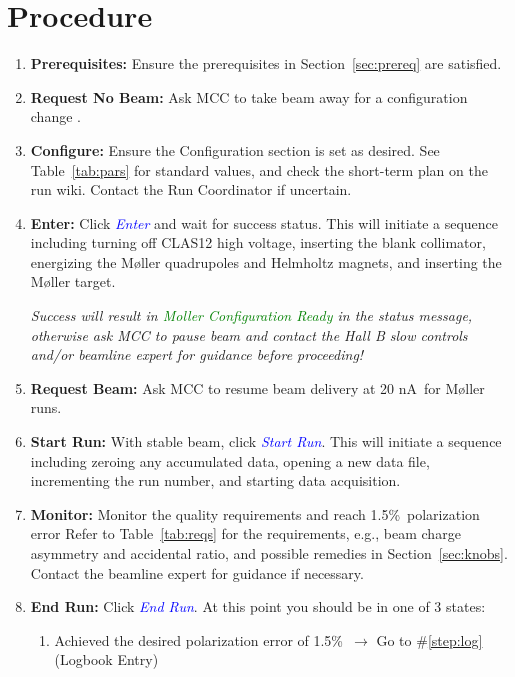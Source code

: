 \documentclass[amsmath,amssymb,notitlepage,12pt]{revtex4}
\newcommand{\ibeam}{20 nA\ }
\newcommand{\easy}{1.5\%}
\begin{document}
\section{Procedure}\label{sec:proc}

\begin{enumerate}\singlespacing
    \item {\bf Prerequisites:}  Ensure the prerequisites in Section~\ref{sec:prereq} are satisfied.
    \item {\bf Request No Beam:}  Ask MCC to take beam away for a configuration change \label{step:config}.
    \item {\bf Configure:}  Ensure the Configuration section is set as desired.
        See Table~\ref{tab:pars} for standard values, and check the short-term plan on the run wiki.  Contact the Run Coordinator if uncertain.
    \item {\bf Enter:} Click \textcolor{blue}{\em Enter} and wait for success status.
        This will initiate a sequence including turning off CLAS12 high voltage, inserting the blank collimator, energizing the M{\o}ller quadrupoles and Helmholtz magnets, and inserting the M{\o}ller target.
        \begin{adjustwidth}{1cm}{1cm}
            {\em Success will result in \textcolor{green}{\em Moller Configuration Ready} in the status message, otherwise ask MCC to pause beam and contact the Hall B slow controls and/or beamline expert for guidance before proceeding!}
        \end{adjustwidth}
    \item {\bf Request Beam:} Ask MCC to resume beam delivery at \ibeam for M{\o}ller runs.
    \item {\bf Start Run:} With stable beam, click \textcolor{blue}{\em Start Run}\label{step:start}.
        This will initiate a sequence including zeroing any accumulated data, opening a new data file, incrementing the run number, and starting data acquisition.
    \item {\bf Monitor:} Monitor the quality requirements and reach \easy\ polarization error
        Refer to Table~\ref{tab:reqs} for the requirements, e.g., beam charge asymmetry and accidental ratio, and possible remedies in Section~\ref{sec:knobs}.
        Contact the beamline expert for guidance if necessary.  
    \item {\bf End Run:} Click \textcolor{blue}{\em End Run}.  At this point you should be in one of 3 states:
        \begin{enumerate}
            \item Achieved the desired polarization error of \easy\ $\to$ Go to \#\ref{step:log} (Logbook Entry)

\end{enumerate}
\end{enumerate}
\end{document}
